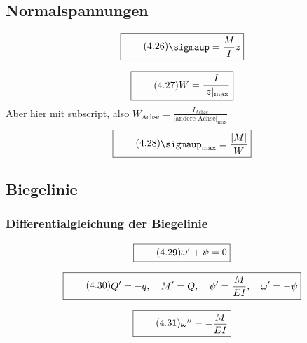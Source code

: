 \documentclass[11pt]{article}
\newcommand{\1}{ {\mathds{1}} }
\newcommand{\abs}[1]{\lvert#1\rvert}
\renewcommand{\sigma  }{\sigmaup   }
\begin{document}
		\subsection{Normalspannungen}

		\begin{equation}
			\boxed{
				\tag{4.26}
				\begin{split}
					\sigma
					=
					\frac{M}{I}
					z
				\end{split}
			}
		\end{equation}
		
		\begin{equation}
			\boxed{
				\tag{4.27}
				\begin{split}
					W
					=
					\frac{I}{\abs{z}_{\text{max}}}
				\end{split}
			}
		\end{equation}
		Aber hier mit subscript, also $\displaystyle W_{\text{Achse}} = \frac{I_{\text{Achse}}}{\abs{\text{andere Achse}}_{\text{max}}}$
		\begin{equation}
			\boxed{
				\tag{4.28}
				\begin{split}
					\sigma_{\text{max}}
					=
					\frac{\abs{M}}{W}
				\end{split}
			}
		\end{equation}
		
		\subsection{Biegelinie}
		\subsubsection{Differentialgleichung der Biegelinie}

		\begin{equation}
			\boxed{
				\tag{4.29}
				\begin{split}
					\omega' + \psi = 0
				\end{split}
			}
		\end{equation}

		\begin{equation}
			\boxed{
				\tag{4.30}
				\begin{split}
					Q' = -q,\quad M' = Q, \quad \psi' = \frac{M}{E I}, \quad \omega' = -\psi
				\end{split}
			}
		\end{equation}

		\begin{equation}
			\boxed{
				\tag{4.31}
				\begin{split}
					\omega'' = -\frac{M}{E I}
				\end{split}
			}
		\end{equation}
\end{document}
